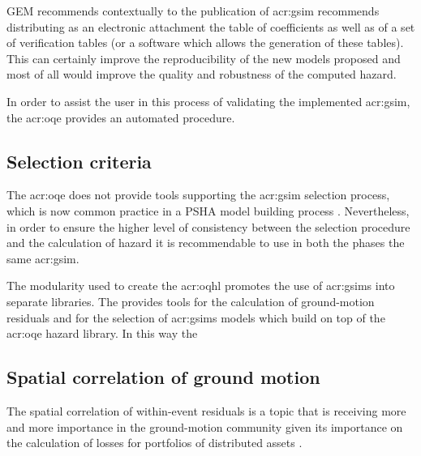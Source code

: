 GEM recommends contextually to the publication of \gls{acr:gsim} recommends
distributing as an electronic attachment the table of coefficients as well 
as of a set of verification tables (or a software which allows the generation 
of these tables). This can certainly improve the reproducibility of the 
new models proposed and most of all would improve the quality and 
robustness of the computed hazard.

In order to assist the user in this process of validating the implemented 
\gls{acr:gsim}, the \gls{acr:oqe} provides an automated procedure. 
%
\subsection{Selection criteria}
The \gls{acr:oqe} does not provide tools supporting the \gls{acr:gsim}
selection process, which is now common practice in a PSHA model building 
process \parencite[see for example][]{delavaud2012}. Nevertheless, in order 
to ensure the higher level of consistency between the selection procedure and
the calculation of hazard it is recommendable to use in both the phases the 
same \gls{acr:gsim}. 

The modularity used to create the {acr:oqhl} promotes the use of 
\glspl{acr:gsim} into separate libraries. The %
\parencite{weatherill2014} provides tools for the calculation of ground-motion
residuals and for the selection of \glspl{acr:gsim} models which build on top 
of the \gls{acr:oqe} hazard library. In this way the 
%
\subsection{Spatial correlation of ground motion}
The spatial correlation of within-event residuals is a topic that is 
receiving more and more importance in the ground-motion community given 
its importance on the calculation of losses for portfolios of distributed 
assets \parencite{crowley2006}.
